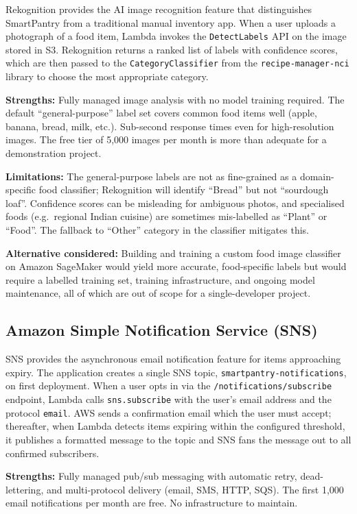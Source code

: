 \documentclass[conference]{IEEEtran}
\begin{document}
Rekognition provides the AI image recognition feature that distinguishes SmartPantry from a traditional manual inventory app. When a user uploads a photograph of a food item, Lambda invokes the \texttt{DetectLabels} API on the image stored in S3. Rekognition returns a ranked list of labels with confidence scores, which are then passed to the \texttt{CategoryClassifier} from the \texttt{recipe-manager-nci} library to choose the most appropriate category.

\textbf{Strengths:} Fully managed image analysis with no model training required. The default ``general-purpose'' label set covers common food items well (apple, banana, bread, milk, etc.). Sub-second response times even for high-resolution images. The free tier of 5{,}000 images per month is more than adequate for a demonstration project.

\textbf{Limitations:} The general-purpose labels are not as fine-grained as a domain-specific food classifier; Rekognition will identify ``Bread'' but not ``sourdough loaf''. Confidence scores can be misleading for ambiguous photos, and specialised foods (e.g.\ regional Indian cuisine) are sometimes mis-labelled as ``Plant'' or ``Food''. The fallback to ``Other'' category in the classifier mitigates this.

\textbf{Alternative considered:} Building and training a custom food image classifier on Amazon SageMaker would yield more accurate, food-specific labels but would require a labelled training set, training infrastructure, and ongoing model maintenance, all of which are out of scope for a single-developer project.

\subsection{Amazon Simple Notification Service (SNS)}

SNS provides the asynchronous email notification feature for items approaching expiry. The application creates a single SNS topic, \texttt{smartpantry-notifications}, on first deployment. When a user opts in via the \texttt{/notifications/subscribe} endpoint, Lambda calls \texttt{sns.subscribe} with the user's email address and the protocol \texttt{email}. AWS sends a confirmation email which the user must accept; thereafter, when Lambda detects items expiring within the configured threshold, it publishes a formatted message to the topic and SNS fans the message out to all confirmed subscribers.

\textbf{Strengths:} Fully managed pub/sub messaging with automatic retry, dead-lettering, and multi-protocol delivery (email, SMS, HTTP, SQS). The first 1{,}000 email notifications per month are free. No infrastructure to maintain.
\end{document}

